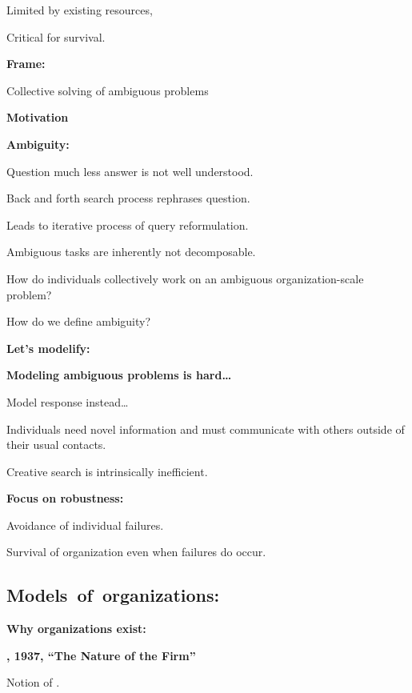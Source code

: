       Limited by existing resources,
     
      Critical for survival.
    
  

  \textbf{Frame:}
    
     
      Collective solving of ambiguous problems
    
  


  \textbf{Motivation}

  \textbf{Ambiguity:}
    
    
      Question much less answer is not well understood.
    
      Back and forth search process rephrases question.
    
      Leads to iterative process of query reformulation.
    
      Ambiguous tasks are inherently not decomposable.
    
      How do individuals collectively work
      on an ambiguous organization-scale problem?
    
      How do we define ambiguity?
    



  \textbf{Let's modelify:}

  \textbf{Modeling ambiguous problems is hard\ldots}
    
    
      Model response instead\ldots
     
      Individuals need novel information and must communicate with others
      outside of their usual contacts.
      
      Creative search is intrinsically inefficient.
    
  

  \textbf{Focus on robustness:}
    
     
      Avoidance of individual failures.
    
      Survival of organization even when failures do occur.
    
   


\subsection{Models\ of\ organizations:}

  \textbf{Why organizations exist:}

  \textbf{, 1937, ``The Nature of the Firm''\cite{coase1937a}}
    
     
      Notion of .
     

